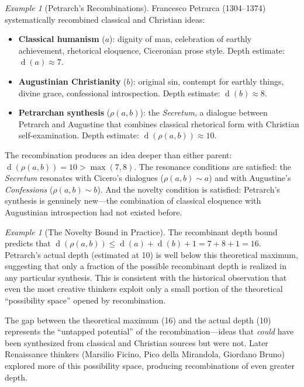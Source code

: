 \documentclass[11pt,openany]{book}
\theoremstyle{definition}
\theoremstyle{plain}
\theoremstyle{remark}
\newtheorem{example}[axiom]{Example}
\newcommand{\res}{\sim}                      %
\newcommand{\depth}{\operatorname{d}}       %
\begin{document}
\begin{example}[Petrarch's Recombinations]
Francesco Petrarca (1304--1374) systematically recombined classical and Christian ideas:
\begin{itemize}
\item \textbf{Classical humanism} ($a$): dignity of man, celebration of earthly achievement, rhetorical eloquence, Ciceronian prose style. Depth estimate: $\depth(a) \approx 7$.
\item \textbf{Augustinian Christianity} ($b$): original sin, contempt for earthly things, divine grace, confessional introspection. Depth estimate: $\depth(b) \approx 8$.
\item \textbf{Petrarchan synthesis} ($\rho(a, b)$): the \textit{Secretum}, a dialogue between Petrarch and Augustine that combines classical rhetorical form with Christian self-examination. Depth estimate: $\depth(\rho(a, b)) \approx 10$.
\end{itemize}
The recombination produces an idea deeper than either parent: $\depth(\rho(a, b)) = 10 > \max(7, 8)$. The resonance conditions are satisfied: the \textit{Secretum} resonates with Cicero's dialogues ($\rho(a, b) \res a$) and with Augustine's \textit{Confessions} ($\rho(a, b) \res b$). And the novelty condition is satisfied: Petrarch's synthesis is genuinely new---the combination of classical eloquence with Augustinian introspection had not existed before.
\end{example}

\begin{example}[The Novelty Bound in Practice]
The recombinant depth bound predicts that $\depth(\rho(a, b)) \leq \depth(a) + \depth(b) + 1 = 7 + 8 + 1 = 16$. Petrarch's actual depth (estimated at 10) is well below this theoretical maximum, suggesting that only a fraction of the possible recombinant depth is realized in any particular synthesis. This is consistent with the historical observation that even the most creative thinkers exploit only a small portion of the theoretical ``possibility space'' opened by recombination.

The gap between the theoretical maximum (16) and the actual depth (10) represents the ``untapped potential'' of the recombination---ideas that \emph{could} have been synthesized from classical and Christian sources but were not. Later Renaissance thinkers (Marsilio Ficino, Pico della Mirandola, Giordano Bruno) explored more of this possibility space, producing recombinations of even greater depth.
\end{example}
\end{document}
